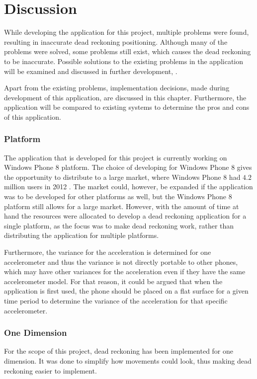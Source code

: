 \chapter{Discussion}\label{chapter:discussion}
While developing the application for this project, multiple problems were found, resulting in inaccurate dead reckoning positioning.
Although many of the problems were solved, some problems still exist, which causes the dead reckoning to be inaccurate.
Possible solutions to the existing problems in the application will be examined and discussed in further development, .

Apart from the existing problems, implementation decisions, made during development of this application, are discussed in this chapter.
Furthermore, the application will be compared to existing systems to determine the pros and cons of this application.

\subsection*{Platform}
The application that is developed for this project is currently working on Windows Phone 8 platform.
The choice of developing for Windows Phone 8 gives the opportunity to distribute to a large market, where Windows Phone 8 had $4.2$ million users in 2012 \citep{misc:wp8-users}.
The market could, however, be expanded if the application was to be developed for other platforms as well, but the Windows Phone 8 platform still allows for a large market.
However, with the amount of time at hand the resources were allocated to develop a dead reckoning application for a single platform, as the focus was to make dead reckoning work, rather than distributing the application for multiple platforms. 

Furthermore, the variance for the acceleration is determined for one accelerometer and thus the variance is not directly portable to other phones, which may have other variances for the acceleration even if they have the same accelerometer model.
For that reason, it could be argued that when the application is first used, the phone should be placed on a flat surface for a given time period to determine the variance of the acceleration for that specific accelerometer.

\subsection*{One Dimension}
For the scope of this project, dead reckoning has been implemented for one dimension.
It was done to simplify how movements could look, thus making dead reckoning easier to implement.

